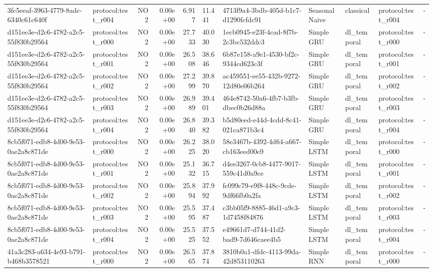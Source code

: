 \begin{table}[htbp]
\begin{tabular}{llrrr}
3fc5eeaf-3963-4779-8adc-6340c61c640f & protocol:test\_r004 & NO2 & 0.00e+00 & 6.917 & 11.441 & 4713f9a4-3bdb-405d-b1c7-d1290fcfdc91 & SeasonalNaive & classical & protocol:test\_r004 & - \\
d151ee3e-d2c6-4782-a2c5-55f830b29564 & protocol:test\_r000 & NO2 & 0.00e+00 & 27.733 & 40.030 & 1ecb0945-e23f-4cad-8f7b-2c3bc532ddc3 & Simple GRU & dl\_temporal & protocol:test\_r000 & - \\
d151ee3e-d2c6-4782-a2c5-55f830b29564 & protocol:test\_r001 & NO2 & 0.00e+00 & 26.508 & 38.646 & 6b87e158-a9e1-4530-bf2c-9344cd623c3f & Simple GRU & dl\_temporal & protocol:test\_r001 & - \\
d151ee3e-d2c6-4782-a2c5-55f830b29564 & protocol:test\_r002 & NO2 & 0.00e+00 & 27.299 & 39.870 & ac459551-ee55-432b-9272-12d80e06b264 & Simple GRU & dl\_temporal & protocol:test\_r002 & - \\
d151ee3e-d2c6-4782-a2c5-55f830b29564 & protocol:test\_r003 & NO2 & 0.00e+00 & 26.989 & 39.401 & 464e8742-50a6-4fb7-b3fb-dbec0b26d88a & Simple GRU & dl\_temporal & protocol:test\_r003 & - \\
d151ee3e-d2c6-4782-a2c5-55f830b29564 & protocol:test\_r004 & NO2 & 0.00e+00 & 26.840 & 39.382 & b5d80eed-e44d-4cdd-8c41-021ca871b3c4 & Simple GRU & dl\_temporal & protocol:test\_r004 & - \\
8cb5f071-edb8-4d00-9e53-0ae2a8c871de & protocol:test\_r000 & NO2 & 0.00e+00 & 26.225 & 38.020 & 58e3467b-4392-4d64-a667-cb163eed00e9 & Simple LSTM & dl\_temporal & protocol:test\_r000 & - \\
8cb5f071-edb8-4d00-9e53-0ae2a8c871de & protocol:test\_r001 & NO2 & 0.00e+00 & 25.132 & 36.715 & d4ee3267-0cb8-4477-9017-559c41d0a9ce & Simple LSTM & dl\_temporal & protocol:test\_r001 & - \\
8cb5f071-edb8-4d00-9e53-0ae2a8c871de & protocol:test\_r002 & NO2 & 0.00e+00 & 25.894 & 37.992 & fc099c79-e9f8-448c-9cde-9df66fb0a2fa & Simple LSTM & dl\_temporal & protocol:test\_r002 & - \\
8cb5f071-edb8-4d00-9e53-0ae2a8c871de & protocol:test\_r003 & NO2 & 0.00e+00 & 25.595 & 37.487 & c3bb05f9-8885-46d1-a9c3-1d7458f84876 & Simple LSTM & dl\_temporal & protocol:test\_r003 & - \\
8cb5f071-edb8-4d00-9e53-0ae2a8c871de & protocol:test\_r004 & NO2 & 0.00e+00 & 25.525 & 37.552 & e49661d7-d744-41d2-bad9-7d646caee4b5 & Simple LSTM & dl\_temporal & protocol:test\_r004 & - \\
41a3c283-a634-4e93-b791-b468b3578521 & protocol:test\_r000 & NO2 & 0.00e+00 & 26.565 & 37.874 & 3810b0a1-dfdc-4113-99da-42d853110263 & Simple RNN & dl\_temporal & protocol:test\_r000 & - \\

\end{tabular}
\end{table}
